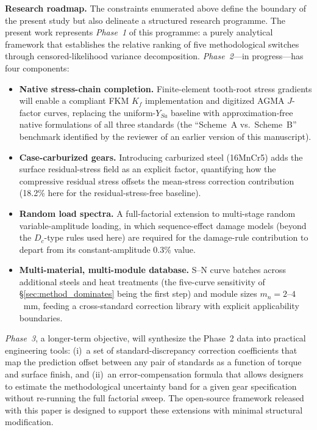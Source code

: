 \documentclass[twocolumn,12pt,a4paper]{article}
\begin{document}
\medskip
\noindent\textbf{Research roadmap.}
The constraints enumerated above define the boundary of the present
study but also delineate a structured research programme. The present
work represents \emph{Phase~1} of this programme: a purely analytical
framework that establishes the relative ranking of five
methodological switches through censored-likelihood variance
decomposition. \emph{Phase~2}---in progress---has four components:
\begin{itemize}
  \item \textbf{Native stress-chain completion.} Finite-element
        tooth-root stress gradients will enable a compliant FKM $K_f$
        implementation and digitized AGMA $J$-factor curves, replacing
        the uniform-$Y_{Sa}$ baseline with approximation-free native
        formulations of all three standards (the ``Scheme~A vs.\
        Scheme~B'' benchmark identified by the reviewer of an earlier
        version of this manuscript).
  \item \textbf{Case-carburized gears.} Introducing carburized
        steel (16MnCr5) adds the surface residual-stress field as an
        explicit factor, quantifying how the compressive residual
        stress offsets the mean-stress correction contribution
        (18.2\% here for the residual-stress-free baseline).
  \item \textbf{Random load spectra.} A full-factorial extension to
        multi-stage random variable-amplitude loading, in which
        sequence-effect damage models (beyond the $D_c$-type rules
        used here) are required for the damage-rule contribution to
        depart from its constant-amplitude 0.3\% value.
  \item \textbf{Multi-material, multi-module database.} S--N curve
        batches across additional steels and heat treatments (the
        five-curve sensitivity of \S\ref{sec:method_dominates} being
        the first step) and module sizes $m_n=2$--$4$~mm, feeding a
        cross-standard correction library with explicit
        applicability boundaries.
\end{itemize}
\emph{Phase~3}, a longer-term objective, will synthesize the Phase~2
data into practical engineering tools: (i)~a set of
standard-discrepancy correction coefficients that map the prediction
offset between any pair of standards as a function of torque and
surface finish, and (ii)~an error-compensation formula that allows
designers to estimate the methodological uncertainty band for a given
gear specification without re-running the full factorial sweep. The
open-source framework released with this paper is designed to support
these extensions with minimal structural modification.
\end{document}
